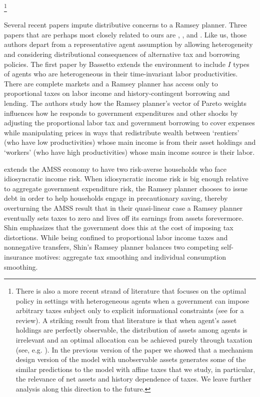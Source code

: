 \documentclass[thmsb,11pt]{article}
\begin{document}
\footnote{ There is also a more recent strand of literature that focuses on the optimal policy in settings with
heterogeneous agents when a government can impose arbitrary taxes subject only
to explicit informational constraints (see \citet{golosov2007new} for a review). A striking result from that literature
is that when  agent's asset holdings are perfectly observable, the distribution of assets among
agents is irrelevant and an optimal allocation can be achieved purely through
taxation (see, e.g. \citet{Bassetto2004}).  In the previous version of the paper we showed that a mechanism design version of the model with unobservable assets generates some of the similar predictions to the model with affine taxes that we study, in particular, the relevance of net assets and history dependence of taxes. We leave further analysis along this
direction to the  future.}

Several recent papers impute distributive concerns to a Ramsey planner.
Three papers that are perhaps most closely related to ours are \citet{Bassetto1999}, \citet{shin2006ramsey}, and \citet{Wer07a}. Like us, those authors depart from
a representative agent assumption by allowing heterogeneity and considering
distributional consequences of alternative tax and borrowing policies.
The first paper by Bassetto extends the \citet{LucasJr.1983} environment to include $I$ types of
agents who are heterogeneous in their time-invariant labor productivities. There are complete markets and a Ramsey planner  has access only
to proportional taxes on labor income and history-contingent borrowing and
lending. The authors study how the Ramsey planner's vector of Pareto weights
influences how he responds to government expenditures and other shocks by
adjusting the proportional labor tax and government borrowing to cover
expenses while manipulating prices in ways that redistribute wealth between
 `rentiers' (who have low productivities) whose main income is from their asset holdings
and  `workers' (who have high productivities) whose main income source is their labor.

\citet{shin2006ramsey} extends the AMSS economy to have two risk-averse households who
face idiosyncratic income risk. When idiosyncratic income risk is big enough
relative to aggregate government expenditure risk, the Ramsey planner
chooses to issue debt in order to help households engage in precautionary
saving, thereby overturning the AMSS result that  in their quasi-linear case a
 Ramsey planner  eventually sets taxes to zero and lives off its earnings from assets forevermore.
  Shin emphasizes that the
government does this at the cost of imposing tax distortions. While being
confined to proportional labor income taxes and nonnegative
transfers, Shin's Ramsey planner balances two competing self-insurance
motives: aggregate tax smoothing and individual consumption smoothing.
\end{document}
